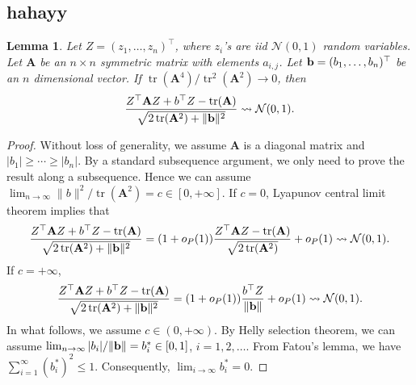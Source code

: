 \documentclass[11pt]{article}
\DeclareMathOperator{\mytr}{tr}
\newcommand{\BA}{\mathbf{A}}    \newcommand{\BB}{\mathbf{B}}    \newcommand{\BC}{\mathbf{C}}    \newcommand{\BD}{\mathbf{D}}    \newcommand{\BE}{\mathbf{E}}    \newcommand{\BF}{\mathbf{F}}    \newcommand{\BG}{\mathbf{G}}    \newcommand{\BH}{\mathbf{H}}    \newcommand{\BI}{\mathbf{I}}    \newcommand{\BJ}{\mathbf{J}}    \newcommand{\BK}{\mathbf{K}}    \newcommand{\BL}{\mathbf{L}}
\theoremstyle{plain}
\newtheorem{lemma}{\quad\quad Lemma}
\theoremstyle{definition}
\theoremstyle{remark}
\begin{document}
\begin{appendices}
\section{hahayy}

\begin{lemma}
    Let $Z=(z_1,\ldots, z_n)^\top$, where $z_i$'s are iid $\mathcal N(0,1)$ random variables.
    Let $\BA$ be an $n\times n$ symmetric matrix with elements $a_{i,j}$.
    Let $\mathbf{b}=(b_1,\ldots, b_n)^\top$ be an $n$ dimensional vector.
    If $\mytr(\BA^4)/\mytr^2(\BA^2)\to 0$,
    then
    \begin{equation*}
        \frac{Z^\top \BA Z + b^\top Z - \mytr(\BA)}{\sqrt{2\mytr(\BA^2)+\|\Bb\|^2}}
        \rightsquigarrow \mathcal N(0,1).
    \end{equation*}
    \label{Lemma:normal}
\end{lemma}
\begin{proof}

    Without loss of generality, we assume $\BA$ is a diagonal matrix and $|b_1|\geq \cdots\geq |b_n|$.
    By a standard subsequence argument, we only need to prove the result along a subsequence.
    Hence we can assume $\lim_{n\to \infty}\|b\|^2/\mytr(\BA^2) =c \in [0,+\infty]$.
    If $ c=0$, Lyapunov central limit theorem implies that
    \begin{equation*}
        \frac{Z^\top \BA Z + b^\top Z - \mytr(\BA)}{\sqrt{2\mytr(\BA^2)+\|\Bb\|^2}}
        =(1+o_P(1))
        \frac{Z^\top \BA Z - \mytr(\BA)}{\sqrt{2\mytr(\BA^2)}}
        +o_P(1)
        \rightsquigarrow \mathcal N (0,1).
    \end{equation*}
    If $c=+\infty$,
    \begin{equation*}
        \frac{Z^\top \BA Z + b^\top Z - \mytr(\BA)}{\sqrt{2\mytr(\BA^2)+\|\Bb\|^2}}
        =(1+o_P(1))
        \frac{b^\top Z}{\|\Bb\|}
        +o_P(1)
        \rightsquigarrow \mathcal N (0,1).
    \end{equation*}
    In what follows, we assume $c\in (0,+\infty)$.
    By Helly selection theorem, we can assume $\lim_{n\to \infty} |b_i|/\|\mathbf{b}\|= b_i^*\in [0,1]$, $i=1,2,\ldots$.
From Fatou's lemma, we have $\sum_{i=1}^{\infty} (b_i^{*})^2\leq 1$.
Consequently, $\lim_{i\to \infty} b_i^* =0$.


\end{proof}
\end{appendices}
\end{document}
